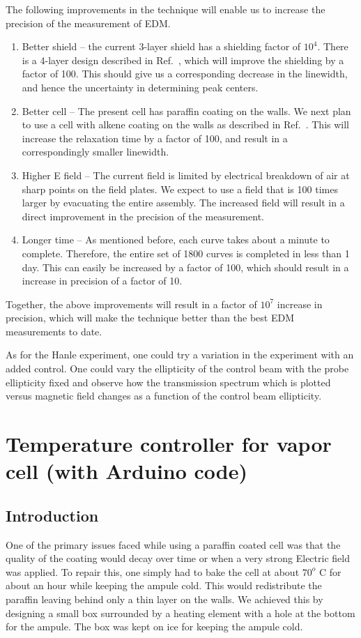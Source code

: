 The following improvements in the technique will enable us to increase the precision of the measurement of EDM.
\begin{enumerate}
\item Better shield -- the current 3-layer shield has a shielding factor of $ 10^4 $. There is a 4-layer design described in Ref.\ \cite{BGK02}, which will improve the shielding by a factor of 100. This should give us a corresponding decrease in the linewidth, and hence the uncertainty in determining peak centers.

\item Better cell -- The present cell has paraffin coating on the walls. We next plan to use a cell with alkene coating on the walls as described in Ref.\ \cite{BKL10}. This will increase the relaxation time by a factor of 100, and result in a correspondingly smaller linewidth.

\item Higher E field -- The current field is limited by electrical breakdown of air at sharp points on the field plates. We expect to use a field that is 100 times larger by evacuating the entire assembly. The increased field will result in a direct improvement in the precision of the measurement.

\item Longer time -- As mentioned before, each curve takes about a minute to complete. Therefore, the entire set of 1800 curves is completed in less than 1 day. This can easily be increased by a factor of 100, which should result in a increase in precision of a factor of 10.
\end{enumerate}
Together, the above improvements will result in a factor of $ 10^7 $ increase in precision, which will make the technique better than the best EDM measurements to date.

As for the Hanle experiment, one could try a variation in the experiment with an added control. One could vary the ellipticity of the control beam with the probe ellipticity fixed and observe how the transmission spectrum which is plotted versus magnetic field changes as a function of the control beam ellipticity.


\appendix

\chapter{Temperature controller for vapor cell (with Arduino code)}
\section{Introduction}
One of the primary issues faced while using a paraffin coated cell was that the quality of the coating would decay over time or when a very strong Electric field was applied. To repair this, one simply had to bake the cell at about $70^o$ C for about an hour while keeping the ampule cold. This would redistribute the paraffin leaving behind only a thin layer on the walls. We achieved this by designing a small box surrounded by a heating element with a hole at the bottom for the ampule. The box was kept on ice for keeping the ampule cold.

